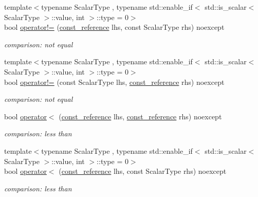 \begin{DoxyCompactItemize}
{\footnotesize template$<$typename Scalar\+Type , typename std\+::enable\+\_\+if$<$ std\+::is\+\_\+scalar$<$ Scalar\+Type $>$\+::value, int $>$\+::type  = 0$>$ }\\bool \hyperlink{classnlohmann_1_1basic__json_afefc38fc08bdb7a9a7474b5ab4a1140f}{operator!=} (\hyperlink{classnlohmann_1_1basic__json_a4057c5425f4faacfe39a8046871786ca}{const\+\_\+reference} lhs, const Scalar\+Type rhs) noexcept
\begin{DoxyCompactList}\small\item\em comparison\+: not equal \end{DoxyCompactList}\item 
{\footnotesize template$<$typename Scalar\+Type , typename std\+::enable\+\_\+if$<$ std\+::is\+\_\+scalar$<$ Scalar\+Type $>$\+::value, int $>$\+::type  = 0$>$ }\\bool \hyperlink{classnlohmann_1_1basic__json_ab0e886db6e9fa91ff9fd853333fed05b}{operator!=} (const Scalar\+Type lhs, \hyperlink{classnlohmann_1_1basic__json_a4057c5425f4faacfe39a8046871786ca}{const\+\_\+reference} rhs) noexcept
\begin{DoxyCompactList}\small\item\em comparison\+: not equal \end{DoxyCompactList}\item 
bool \hyperlink{classnlohmann_1_1basic__json_aacd442b66140c764c594ac8ad7dfd5b3}{operator$<$} (\hyperlink{classnlohmann_1_1basic__json_a4057c5425f4faacfe39a8046871786ca}{const\+\_\+reference} lhs, \hyperlink{classnlohmann_1_1basic__json_a4057c5425f4faacfe39a8046871786ca}{const\+\_\+reference} rhs) noexcept
\begin{DoxyCompactList}\small\item\em comparison\+: less than \end{DoxyCompactList}\item 
{\footnotesize template$<$typename Scalar\+Type , typename std\+::enable\+\_\+if$<$ std\+::is\+\_\+scalar$<$ Scalar\+Type $>$\+::value, int $>$\+::type  = 0$>$ }\\bool \hyperlink{classnlohmann_1_1basic__json_a7999ee3a69a4979d92e98ab1e88c8759}{operator$<$} (\hyperlink{classnlohmann_1_1basic__json_a4057c5425f4faacfe39a8046871786ca}{const\+\_\+reference} lhs, const Scalar\+Type rhs) noexcept
\begin{DoxyCompactList}\small\item\em comparison\+: less than \end{DoxyCompactList}\item 

\end{DoxyCompactItemize}
